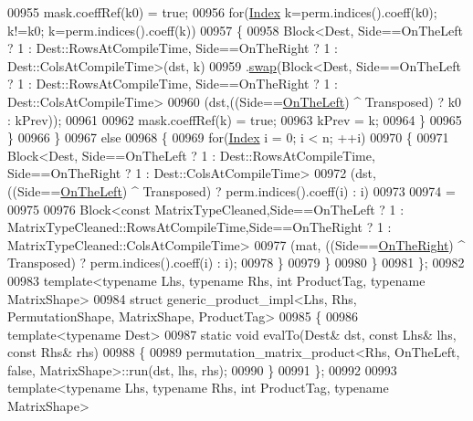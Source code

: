 \begin{DoxyCode}
00955           mask.coeffRef(k0) = \textcolor{keyword}{true};
00956           \textcolor{keywordflow}{for}(\hyperlink{namespace_eigen_a62e77e0933482dafde8fe197d9a2cfde}{Index} k=perm.indices().coeff(k0); k!=k0; k=perm.indices().coeff(k))
00957           \{
00958                   Block<Dest, Side==OnTheLeft ? 1 : Dest::RowsAtCompileTime, Side==OnTheRight ? 1 :
       Dest::ColsAtCompileTime>(dst, k)
00959             .\hyperlink{endian_8c_a3ca5ecd34b04d6a243c054ac3a57f68d}{swap}(Block<Dest, Side==OnTheLeft ? 1 : Dest::RowsAtCompileTime, Side==OnTheRight ? 1 :
       Dest::ColsAtCompileTime>
00960                        (dst,((Side==\hyperlink{group__enums_ggac22de43beeac7a78b384f99bed5cee0ba129609b3bdf23b071f5f86cf2f995ec4}{OnTheLeft}) ^ Transposed) ? k0 : kPrev));
00961 
00962             mask.coeffRef(k) = \textcolor{keyword}{true};
00963             kPrev = k;
00964           \}
00965         \}
00966       \}
00967       \textcolor{keywordflow}{else}
00968       \{
00969         \textcolor{keywordflow}{for}(\hyperlink{namespace_eigen_a62e77e0933482dafde8fe197d9a2cfde}{Index} i = 0; i < n; ++i)
00970         \{
00971           Block<Dest, Side==OnTheLeft ? 1 : Dest::RowsAtCompileTime, Side==OnTheRight ? 1 :
       Dest::ColsAtCompileTime>
00972                (dst, ((Side==\hyperlink{group__enums_ggac22de43beeac7a78b384f99bed5cee0ba129609b3bdf23b071f5f86cf2f995ec4}{OnTheLeft}) ^ Transposed) ? perm.indices().coeff(i) : i)
00973 
00974           =
00975 
00976           Block<const MatrixTypeCleaned,Side==OnTheLeft ? 1 :
       MatrixTypeCleaned::RowsAtCompileTime,Side==OnTheRight ? 1 : MatrixTypeCleaned::ColsAtCompileTime>
00977                (mat, ((Side==\hyperlink{group__enums_ggac22de43beeac7a78b384f99bed5cee0ba99dc75d8e00b6c3a5bdc31940f47492b}{OnTheRight}) ^ Transposed) ? perm.indices().coeff(i) : i);
00978         \}
00979       \}
00980     \}
00981 \};
00982 
00983 \textcolor{keyword}{template}<\textcolor{keyword}{typename} Lhs, \textcolor{keyword}{typename} Rhs, \textcolor{keywordtype}{int} ProductTag, \textcolor{keyword}{typename} MatrixShape>
00984 \textcolor{keyword}{struct }generic\_product\_impl<Lhs, Rhs, PermutationShape, MatrixShape, ProductTag>
00985 \{
00986   \textcolor{keyword}{template}<\textcolor{keyword}{typename} Dest>
00987   \textcolor{keyword}{static} \textcolor{keywordtype}{void} evalTo(Dest& dst, \textcolor{keyword}{const} Lhs& lhs, \textcolor{keyword}{const} Rhs& rhs)
00988   \{
00989     permutation\_matrix\_product<Rhs, OnTheLeft, false, MatrixShape>::run(dst, lhs, rhs);
00990   \}
00991 \};
00992 
00993 \textcolor{keyword}{template}<\textcolor{keyword}{typename} Lhs, \textcolor{keyword}{typename} Rhs, \textcolor{keywordtype}{int} ProductTag, \textcolor{keyword}{typename} MatrixShape>

\end{DoxyCode}

